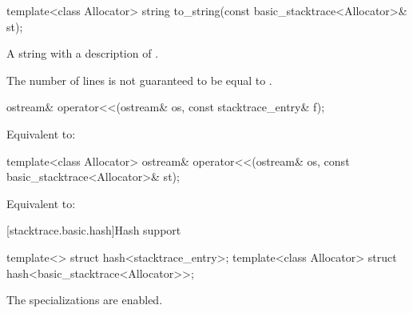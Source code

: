 %
\begin{itemdecl}
template<class Allocator>
string to_string(const basic_stacktrace<Allocator>& st);
\end{itemdecl}

\begin{itemdescr}
\pnum
\returns
A string with a description of .
\begin{note}
The number of lines is not guaranteed to be equal to .
\end{note}
\end{itemdescr}

%
\begin{itemdecl}
ostream& operator<<(ostream& os, const stacktrace_entry& f);
\end{itemdecl}

\begin{itemdescr}
\pnum
\effects
Equivalent to: 
\end{itemdescr}

%
\begin{itemdecl}
template<class Allocator>
  ostream& operator<<(ostream& os, const basic_stacktrace<Allocator>& st);
\end{itemdecl}

\begin{itemdescr}
\pnum
\effects
Equivalent to: 
\end{itemdescr}

[stacktrace.basic.hash]{Hash support}

\begin{itemdecl}
template<> struct hash<stacktrace_entry>;
template<class Allocator> struct hash<basic_stacktrace<Allocator>>;
\end{itemdecl}

\begin{itemdescr}
\pnum
The specializations are enabled.
\end{itemdescr}
